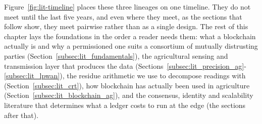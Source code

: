 Figure~\ref{fig:lit-timeline} places these three lineages on one timeline.
They do not meet until the last five years, and even where they meet, as the
sections that follow show, they meet pairwise rather than as a single
design. The rest of this chapter lays the foundations in the order a reader
needs them: what a blockchain actually is and why a permissioned one suits a
consortium of mutually distrusting parties (Section~\ref{subsec:lit_fundamentals}),
the agricultural sensing and transmission layer that produces the data
(Sections~\ref{subsec:lit_precision_ag}-\ref{subsec:lit_lpwan}), the residue
arithmetic we use to decompose readings with
(Section~\ref{subsec:lit_crt}), how blockchain has actually been used in
agriculture (Section~\ref{subsec:lit_blockchain_ag}), and the consensus,
identity and scalability literature that determines what a ledger costs to
run at the edge (the sections after that).

